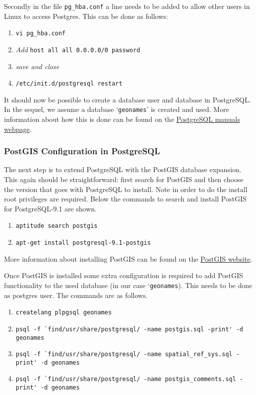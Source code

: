 Secondly in the file \lstinline|pg_hba.conf| a line needs to be added to allow other users in Linux to access Postgres. This can be done as follows:

\begin{enumerate}
	\item \lstinline|vi pg_hba.conf|
	\item \textit{Add} \lstinline|host all all 0.0.0.0/0 password|
	\item \textit{save and close}
	\item \lstinline|/etc/init.d/postgresql restart|
\end{enumerate}

\noindent It should now be possible to create a database user and database
in PostgreSQL. In the sequel, we assume a database `\texttt{geonames}' is
created and used. More information about how this is done can be found on the
\href{http://www.postgresql.org/docs/manuals/}{\textsf{PostgreSQL manuals
webpage}}.

\subsubsection{PostGIS Configuration in PostgreSQL}
\label{sec:postgis}

The next step is to extend PostgreSQL with the PostGIS database expansion.
This again should be straightforward: first search for PostGIS and then
choose the version that goes with PostgreSQL to install. Note in order to do
the install root privileges are required. Below the commands to search and
install PostGIS for PostgreSQL-9.1 are shown.

\begin{enumerate}[noitemsep]
	\item \lstinline|aptitude search postgis|
	\item \lstinline|apt-get install postgresql-9.1-postgis|
\end{enumerate} 

\noindent More information about installing PostGIS can be found on the
\href{http://www.postgis.net/install}{\textsf{PostGIS website}}.

Once PostGIS is installed some extra configuration is required to add
PostGIS functionality to the used database (in our case
`\texttt{geonames}). This needs to be done as postgres user. The commands
are as follows.
\begin{enumerate}[noitemsep]
	\item \lstinline|createlang plpgsql geonames|
	\item \lstinline|psql -f `find/usr/share/postgresql/ -name postgis.sql -print' -d geonames|
	\item \lstinline|psql -f `find/usr/share/postgresql/ -name spatial_ref_sys.sql -print' -d geonames|
	\item \lstinline|psql -f `find/usr/share/postgresql/ -name postgis_comments.sql -print' -d geonames|
\end{enumerate}

